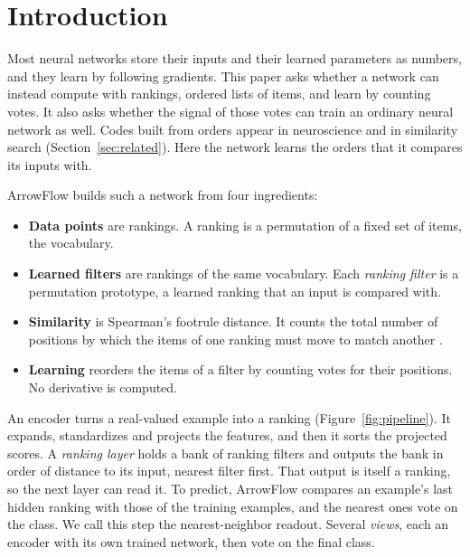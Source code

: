 \section{Introduction}\label{sec:intro}

Most neural networks store their inputs and their learned parameters as numbers, and they learn by following gradients. This paper asks whether a network can instead compute with rankings, ordered lists of items, and learn by counting votes. It also asks whether the signal of those votes can train an ordinary neural network as well. Codes built from orders appear in neuroscience and in similarity search (Section~\ref{sec:related}). Here the network learns the orders that it compares its inputs with.

ArrowFlow builds such a network from four ingredients:
\begin{itemize}[leftmargin=2em,topsep=2pt,itemsep=1pt]
  \item \textbf{Data points} are rankings. A ranking is a permutation of a fixed set of items, the vocabulary.
  \item \textbf{Learned filters} are rankings of the same vocabulary. Each \emph{ranking filter} is a permutation prototype, a learned ranking that an input is compared with.
  \item \textbf{Similarity} is Spearman's footrule distance. It counts the total number of positions by which the items of one ranking must move to match another \citep{diaconis1977footrule}.
  \item \textbf{Learning} reorders the items of a filter by counting votes for their positions. No derivative is computed.
\end{itemize}

An encoder turns a real-valued example into a ranking (Figure~\ref{fig:pipeline}). It expands, standardizes and projects the features, and then it sorts the projected scores. A \emph{ranking layer} holds a bank of ranking filters and outputs the bank in order of distance to its input, nearest filter first. That output is itself a ranking, so the next layer can read it. To predict, ArrowFlow compares an example's last hidden ranking with those of the training examples, and the nearest ones vote on the class. We call this step the nearest-neighbor readout. Several \emph{views}, each an encoder with its own trained network, then vote on the final class.

